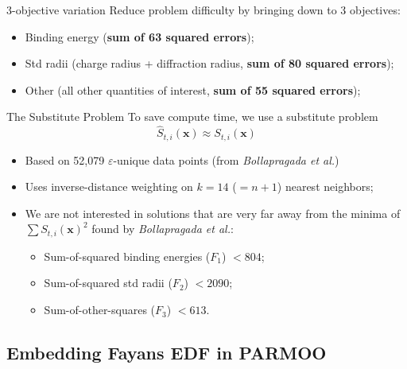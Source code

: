 \documentclass[aspectratio=169]{beamer}
\newcommand{\vx}{\mathbf{x}}
\begin{document}
\begin{frame}{3-objective variation}
Reduce problem difficulty by bringing down to 3 objectives:
\begin{itemize}
\item Binding energy ({\bf sum of 63 squared errors});
\item Std radii (charge radius + diffraction radius, {\bf sum of 80 squared errors});
\item Other (all other quantities of interest, {\bf sum of 55 squared errors});
\end{itemize}
\end{frame}

\begin{frame}{The Substitute Problem}
To save compute time, we use a substitute problem
$${\hat S}_{t,i}(\vx) \approx S_{t,i}(\vx)$$
\begin{itemize}
\item 
Based on 52,079 $\varepsilon$-unique data points
(from {\it Bollapragada et al.})
\item Uses inverse-distance weighting on $k=14$ ($=n+1$) nearest neighbors;
\item We are not interested in solutions that are very far away
from the minima of $\sum S_{t,i}(\vx)^2$ found by {\it Bollapragada et al.}:
\begin{itemize}
\item Sum-of-squared binding energies ($F_1$) $< 804$;
\item Sum-of-squared std radii ($F_2$) $< 2090$;
\item Sum-of-other-squares ($F_3$) $< 613$.
\end{itemize}
\end{itemize}
\end{frame}

\subsection{Embedding Fayans EDF in PARMOO}
\end{document}
